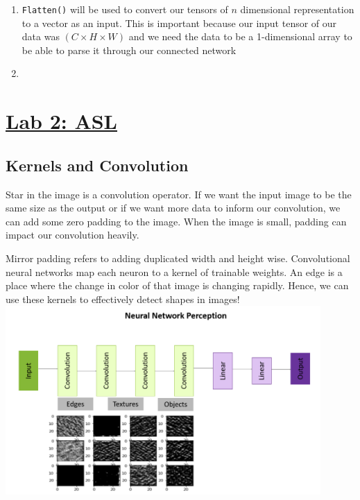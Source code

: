 \documentclass{article}
\begin{document}
\begin{enumerate}
\begin{enumerate}
            \begin{enumerate}
                \item \verb|Flatten()| will be used to convert our tensors of $n$ dimensional representation to a vector as an input. This is important because our input tensor of our data was $(C \times H \times W)$ and we need the data to be a 1-dimensional array to be able to parse it through our connected network
                \item 
            \end{enumerate}
    \end{enumerate}
\end{enumerate}

\section{\href{http://dli-e5d62e622240-a8611b.westus3.cloudapp.azure.com/lab/lab/tree/02_asl.ipynb}{Lab 2: ASL}}
\subsection{Kernels and Convolution}
Star in the image is a convolution operator. If we want the input image to be the same size as the output or if we want more data to inform our convolution, we can add some zero padding to the image. When the image is small, padding can impact our convolution heavily. 

Mirror padding refers to adding duplicated width and height wise. Convolutional neural networks map each neuron to a kernel of trainable weights. An edge is a place where the change in color of that image is changing rapidly. Hence, we can use these kernels to effectively detect shapes in images!\\\includegraphics[width=0.9\textwidth]{../images/nnp_arch.png}
\end{document}
